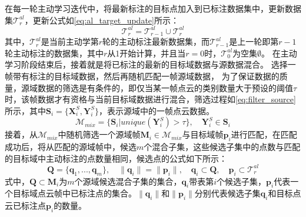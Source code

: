     在每一轮主动学习迭代中，将最新标注的目标点加入到已标注数据集中，更新数据集$\mathcal{T}^{al}_r$，更新公式如\eqref{eq:al_target_update}所示：
    \begin{equation}
        \label{eq:al_target_update}
        \mathcal{T}^{al}_r = \mathcal{T}^{al}_{r-1} \cup \mathcal{T}^{al}_r 
    \end{equation}
    其中，$\mathcal{T}^{al}_r$是当前主动学第$r$轮的主动标注最新数据集，而$\mathcal{T}^{al}_{r-1}$是上一轮即第$r-1$轮主动标注的数据集，其中$r$从1开始计算，并且当$r=0$时，$\mathcal{T}^{al}_0$为空集$\emptyset$。
    在主动学习阶段结束后，接着就是将已标注的最新的目标域数据与源数据混合。
    选择一帧带有标注的目标域数据，然后再随机匹配一帧源域数据，
    为了保证数据的质量，源域数据的筛选是有条件的，即仅当某一帧点云的类别数量大于预设的阈值$\tau$时，该帧数据才有资格与当前目标域数据进行混合，筛选过程如\eqref{eq:filter_source}所示，其中$\mathbf{S}_i = \{\mathbf{X}^S_i,\mathbf{Y}^S_i\}$，表示源域中的一帧点云数据。
    \begin{equation}
        \label{eq:filter_source}
        \mathcal{M}_{mix}= \{\mathbf{S}_i | unique(\mathbf{Y}^S_i)> \tau\}, \quad \mathbf{Y}^S_i \in \mathbf{S}_i
    \end{equation}
    接着，从$\mathcal{M}_{mix}$中随机筛选一个源域帧$\mathbf{M}_i \in \mathcal{M}_{mix}$与目标域帧$\mathbf{p}_i$进行匹配，在匹配成功后，将从匹配的源域帧中，候选$m$个混合子集，这些候选子集中的点数与匹配的目标域中主动标注的点数量相同，候选点的公式如下所示：
    \begin{equation}
        \label{eq:mix_subset}
        \mathbf{Q} = \{\mathbf{q}_1,...,\mathbf{q}_m\}, 
        \quad
        \|\mathbf{q}_i\| = \|\mathbf{p}_i\|,
        \quad
        \mathbf{q}_i \subset \mathbf{Q},
        \quad
        \mathbf{p}_i \subset \mathcal{T}^{al}_r
    \end{equation}
    式中，$\mathbf{Q} \subset \mathbf{M}_i$为$m$个源域候选混合子集的集合，$\mathbf{q}_i$带表第$i$个候选子集，$\mathbf{p}_i$代表一个目标域点云帧中已标注点的集合。$\|\mathbf{q}_i\|$和$\|\mathbf{p}_i\|$分别代表候选子集$\mathbf{q}_i$和目标点云已标注点$\mathbf{p}_i$的数量。


